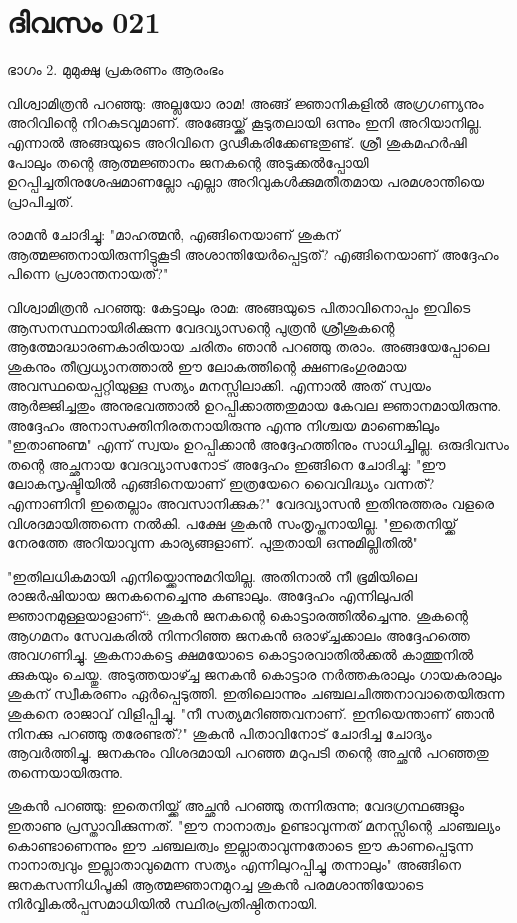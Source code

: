  
\section{ദിവസം 021}

ഭാഗം 2. മുമുക്ഷു പ്രകരണം ആരംഭം 


വിശ്വാമിത്രന്‍ പറഞ്ഞു: അല്ലയോ രാമ! അങ്ങ്‌ ജ്ഞാനികളില്‍ അഗ്രഗണ്യനും അറിവിന്റെ നിറകുടവുമാണ്‌. അങ്ങേയ്ക്ക്‌ കൂടുതലായി ഒന്നും  ഇനി അറിയാനില്ല. എന്നാല്‍ അങ്ങയുടെ അറിവിനെ ദൃഢീകരിക്കേണ്ടതുണ്ട്‌. ശ്രീ ശുകമഹര്‍ഷി പോലും തന്റെ ആത്മജ്ഞാനം ജനകന്റെ അടുക്കല്‍പ്പോയി ഉറപ്പിച്ചതിനുശേഷമാണല്ലോ എല്ലാ അറിവുകള്‍ക്കുമതീതമായ പരമശാന്തിയെ പ്രാപിച്ചത്‌. 

രാമന്‍ ചോദിച്ചു: "മാഹത്മന്‍, എങ്ങിനെയാണ്‌ ശുകന്‌ ആത്മജ്ഞനായിരുന്നിട്ടുകൂടി അശാന്തിയേര്‍പ്പെട്ടത്‌? എങ്ങിനെയാണ്‌ അദ്ദേഹം പിന്നെ പ്രശാന്തനായത്‌?"

വിശ്വാമിത്രന്‍ പറഞ്ഞു: കേട്ടാലും രാമ: അങ്ങയുടെ പിതാവിനൊപ്പം ഇവിടെ ആസനസ്ഥനായിരിക്കുന്ന വേദവ്യാസന്റെ പുത്രന്‍ ശ്രീശുകന്റെ ആത്മോദ്ധാരണകാരിയായ ചരിതം ഞാന്‍ പറഞ്ഞു തരാം. അങ്ങയേപ്പോലെ ശുകനും തീവ്രധ്യാനത്താല്‍ ഈ ലോകത്തിന്റെ ക്ഷണഭംഗുരമായ അവസ്ഥയെപ്പറ്റിയുള്ള സത്യം  മനസ്സിലാക്കി. എന്നാല്‍ അത്‌ സ്വയം ആര്‍ജ്ജിച്ചതും അനുഭവത്താല്‍ ഉറപ്പിക്കാത്തതുമായ കേവല ജ്ഞാനമായിരുന്നു. അദ്ദേഹം അനാസക്തിനിരതനായിരുന്നു എന്നു നിശ്ചയ  മാണെങ്കിലും "ഇതാണുണ്മ" എന്ന് സ്വയം ഉറപ്പിക്കാന്‍ അദ്ദേഹത്തിനും സാധിച്ചില്ല. ഒരുദിവസം തന്റെ അച്ഛനായ വേദവ്യാസനോട്‌ അദ്ദേഹം ഇങ്ങിനെ ചോദിച്ചു: "ഈ ലോകസൃഷ്ടിയില്‍ എങ്ങിനെയാണ്‌ ഇത്രയേറെ വൈവിദ്ധ്യം വന്നത്‌? എന്നാണിനി ഇതെല്ലാം അവസാനിക്കുക?" വേദവ്യാസന്‍ ഇതിനുത്തരം വളരെ വിശദമായിത്തന്നെ നല്‍കി. പക്ഷേ ശുകന്‍ സംതൃപ്തനായില്ല. "ഇതെനിയ്ക്ക്‌ നേരത്തേ അറിയാവുന്ന കാര്യങ്ങളാണ്‌. പുതുതായി ഒന്നുമില്ലിതില്‍"

"ഇതിലധികമായി എനിയ്ക്കൊന്നുമറിയില്ല. അതിനാല്‍ നീ ഭൂമിയിലെ രാജര്‍ഷിയായ ജനകനെച്ചെന്നു കണ്ടാലും. അദ്ദേഹം  എന്നിലുപരി ജ്ഞാനമുള്ളയാളാണ്“.  ശുകന്‍ ജനകന്റെ കൊട്ടാരത്തില്‍ച്ചെന്നു. ശുകന്റെ ആഗമനം സേവകരില്‍ നിന്നറിഞ്ഞ ജനകന്‍ ഒരാഴ്ച്ചക്കാലം അദ്ദേഹത്തെ അവഗണിച്ചു. ശുകനാകട്ടെ ക്ഷമയോടെ കൊട്ടാരവാതില്‍ക്കല്‍ കാത്തുനില്‍ ക്കുകയും ചെയ്തു. അടുത്തയാഴ്ച്ച  ജനകന്‍ കൊട്ടാര നര്‍ത്തകരാലും ഗായകരാലും ശുകന്‌ സ്വീകരണം ഏര്‍പ്പെടുത്തി. ഇതിലൊന്നും ചഞ്ചലചിത്തനാവാതെയിരുന്ന ശുകനെ രാജാവ്‌ വിളിപ്പിച്ചു. "നീ സത്യമറിഞ്ഞവനാണ്‌. ഇനിയെന്താണ്‌ ഞാന്‍ നിനക്കു പറഞ്ഞു തരേണ്ടത്‌?" ശുകന്‍ പിതാവിനോട്‌ ചോദിച്ച ചോദ്യം ആവര്‍ത്തിച്ചു. ജനകനും വിശദമായി പറഞ്ഞ മറുപടി തന്റെ അച്ഛന്‍ പറഞ്ഞതു തന്നെയായിരുന്നു. 

ശുകന്‍ പറഞ്ഞു: ഇതെനിയ്ക്ക്‌ അച്ഛന്‍ പറഞ്ഞു തന്നിരുന്നു; വേദഗ്രന്ഥങ്ങളും ഇതാണു പ്രസ്താവിക്കുന്നത്‌. "ഈ നാനാത്വം ഉണ്ടാവുന്നത്‌ മനസ്സിന്റെ ചാഞ്ചല്യം കൊണ്ടാണെന്നും ഈ ചഞ്ചലത്വം ഇല്ലാതാവുന്നതോടെ ഈ കാണപ്പെടുന്ന നാനാത്വവും ഇല്ലാതാവുമെന്ന സത്യം എന്നിലുറപ്പിച്ചു തന്നാലും" അങ്ങിനെ ജനകസന്നിധിപൂകി ആത്മജ്ഞാനമുറച്ച ശുകന്‍ പരമശാന്തിയോടെ നിര്‍വ്വികല്‍പ്പസമാധിയില്‍ സ്ഥിരപ്രതിഷ്ഠിതനായി.

